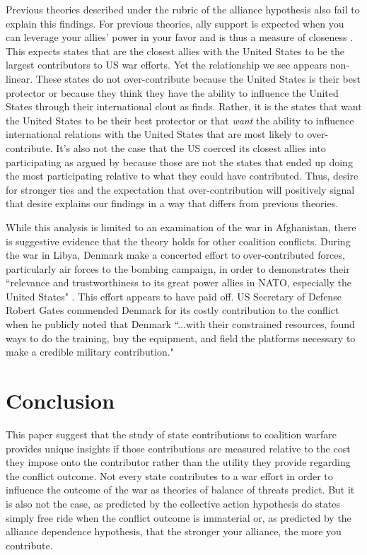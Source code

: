 \documentclass[12pt,letterpaper]{article}
\begin{document}
	Previous theories described under the rubric of the alliance hypothesis also fail to explain this findings. For previous theories, ally support is expected when you can leverage your allies' power in your favor and is thus a measure of closeness \citep{davidson_neoclassicalrealistexplanation_2011}. This expects states that are the closest allies with the United States to be the largest contributors to US war efforts. Yet the relationship we see appears non-linear. These states do not over-contribute because the United States is their best protector or because they think they have the ability to influence the United States through their international clout as \citet{ringsmose_natoburdensharingredux_2010} finds. Rather, it is the states that want the United States to be their best protector or that \textit{want} the ability to influence international relations with the United States that are most likely to over-contribute. It's also not the case that the US coerced its closest allies into participating as argued by \citet{kupchan_natopersiangulf_1988} because those are not the states that ended up doing the most participating relative to what they could have contributed. Thus, desire for stronger ties and the expectation that over-contribution will positively signal that desire explains our findings in a way that differs from previous theories.

	While this analysis is limited to an examination of the war in Afghanistan, there is suggestive evidence that the theory holds for other coalition conflicts. During the war in Libya, Denmark make a concerted effort to over-contributed forces, particularly air forces to the bombing campaign, in order to demonstrates their ``relevance and trustworthiness to its great power allies in NATO, especially the United States" \citep{jakobsen_prestigeseekingsmallstates_2018, dicke_natoburdensharinglibya_2013}. This effort appears to have paid off. US Secretary of Defense Robert Gates commended Denmark for its costly contribution to the conflict when he publicly noted that Denmark ``...with their constrained resources, found ways to do the training, buy the equipment, and field the platforms necessary to make a credible military contribution."

\section{Conclusion}
	This paper suggest that the study of state contributions to coalition warfare provides unique insights if those contributions are measured relative to the cost they impose onto the contributor rather than the utility they provide regarding the conflict outcome. Not every state contributes to a war effort in order to influence the outcome of the war as theories of balance of threats predict. But it is also not the case, as predicted by the collective action hypothesis do states simply free ride when the conflict outcome is immaterial or, as predicted by the alliance dependence hypothesis, that the stronger your alliance, the more you contribute.
	
\end{document}
